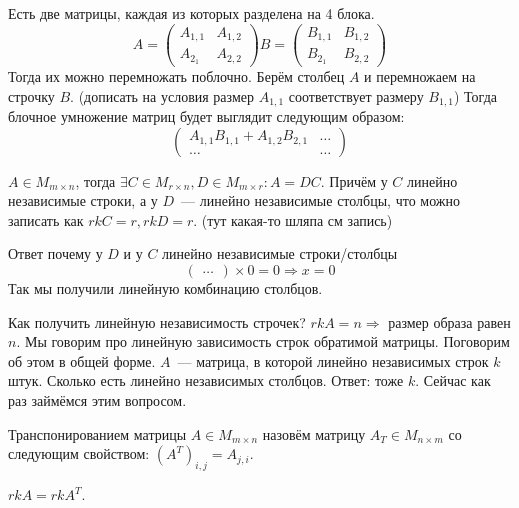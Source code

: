 \begin{remark}
    Есть две матрицы, каждая из которых разделена на 4 блока.
    $$
    A = \begin{pmatrix}
        A_{1,1} & A_{1,2}\\
        A_{2_1} & A_{2,2}
    \end{pmatrix}
    B = \begin{pmatrix}
        B_{1,1} & B_{1,2}\\
        B_{2_1} & B_{2,2}
    \end{pmatrix}
    $$
    Тогда их можно перемножать поблочно.
    Берём столбец $A$ и перемножаем на строчку $B$.
    (дописать на условия размер $A_{1,1}$ соответствует размеру $B_{1,1}$)
    Тогда блочное умножение матриц будет выглядит следующим образом:
    $$
    \begin{pmatrix}
        A_{1,1}B_{1,1} + A_{1,2}B_{2,1} & \dots\\
        \dots & \dots
    \end{pmatrix}
    $$
\end{remark}
\begin{follow}
    $A\in M_{m\times n}$, тогда $\exists C\in M_{r\times n},
    D\in M_{m\times r}: A = DC$. Причём у $C$ линейно независимые строки,
    а у $D$~--- линейно независимые столбцы, что можно записать как $rk C = r, rkD = r$.
    (тут какая-то шляпа см запись)

    Ответ почему у $D$ и у $C$ линейно независимые строки/столбцы
    $$
    \begin{pmatrix}
        \dots
    \end{pmatrix}
    \times 0 = 0 \Rightarrow x = 0
    $$
    Так мы получили линейную комбинацию столбцов.

    Как получить линейную независимость строчек?
    $rkA = n\Rightarrow$ размер образа равен $n$.
    Мы говорим про линейную зависимость строк обратимой матрицы.
    Поговорим об этом в общей форме. 
    $A$~--- матрица, в которой линейно независимых строк $k$ штук.
    Сколько есть линейно независимых столбцов. Ответ: тоже $k$.
    Сейчас как раз займёмся этим вопросом.
\end{follow}
\begin{definition}
    Транспонированием матрицы $A\in M_{m\times n}$ назовём
    матрицу $A_T\in M_{n\times m}$ со следующим свойством:
    $(A^T)_{i,j} = A_{j,i}$.
\end{definition}
\begin{statement}
    $rkA = rkA^T$.
\end{statement}
